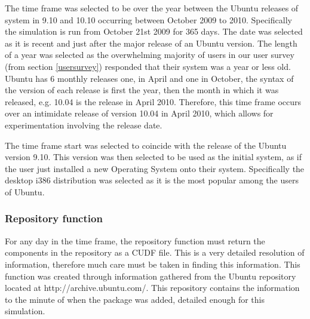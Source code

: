 The time frame was selected to be over the year between the Ubuntu releases of system in 9.10 and 10.10 occurring between October 2009 to 2010.
Specifically the simulation is run from October 21st 2009 for 365 days.
The date was selected as it is recent and just after the major release of an Ubuntu version.
The length of a year was selected as the overwhelming majority of users in our user survey (from section \ref{usersurvey}) responded that their system was a year or less old.
Ubuntu has 6 monthly releases one, in April and one in October, the syntax of the version of each release is first the year,
then the month in which it was released, e.g. 10.04 is the release in April 2010.
Therefore, this time frame occurs over an intimidate release of version 10.04 in April 2010, which allows for experimentation involving the release date.

The time frame start was selected to coincide with the release of the Ubuntu version 9.10.
This version was then selected to be used as the initial system, as if the user just installed a new Operating System onto their system.
Specifically the desktop i386 distribution was selected as it is the most popular among the users of Ubuntu.

\subsubsection{Repository function}
For any day in the time frame, the repository function must return the components in the repository as a CUDF file.
This is a very detailed resolution of information, therefore much care must be taken in finding this information.
This function was created through information gathered from the Ubuntu repository located at http://archive.ubuntu.com/.
This repository contains the information to the minute of when the package was added, detailed enough for this simulation.

